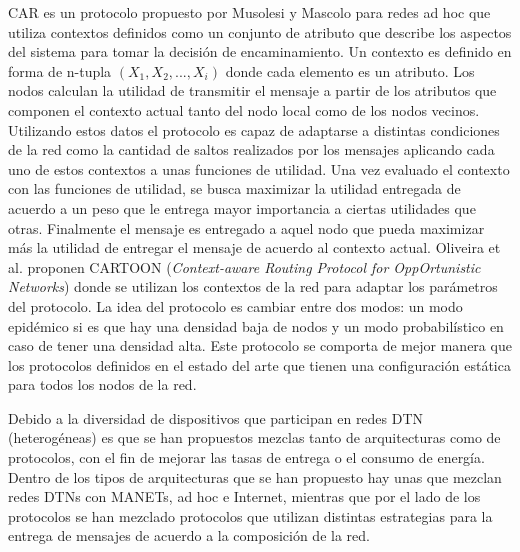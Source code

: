 CAR es un protocolo propuesto por Musolesi y
Mascolo\cite{DBLP:journals/tmc/MusolesiM09} para redes ad hoc que utiliza
contextos definidos como un conjunto de atributo que describe los aspectos del
sistema para tomar la decisión de encaminamiento. Un contexto es definido en
forma de n-tupla $(X_1, X_2, ..., X_i)$ donde cada elemento es un atributo. Los
nodos calculan la utilidad de transmitir el mensaje a partir de los atributos
que componen el contexto actual tanto del nodo local como de los nodos vecinos.
Utilizando estos datos el protocolo es capaz de adaptarse a distintas
condiciones de la red como la cantidad de saltos realizados por los mensajes
aplicando cada uno de estos contextos a unas funciones de utilidad. Una vez
evaluado el contexto con las funciones de utilidad, se busca maximizar la
utilidad entregada de acuerdo a un peso que le entrega mayor importancia a
ciertas utilidades que otras. Finalmente el mensaje es entregado a aquel nodo
que pueda maximizar más la utilidad de entregar el mensaje de acuerdo al
contexto actual.  Oliveira et al. \cite{DBLP:journals/ijwin/OliveiraSPNMMA16}
proponen CARTOON (\textit{Context-aware Routing Protocol for OppOrtunistic
Networks}) donde se utilizan los contextos de la red para adaptar los parámetros
del protocolo. La idea del protocolo es cambiar entre dos modos: un modo
epidémico si es que hay una densidad baja de nodos y un modo probabilístico en
caso de tener una densidad alta. Este protocolo se comporta de mejor manera que
los protocolos definidos en el estado del arte que tienen una configuración
estática para todos los nodos de la red.




Debido a la diversidad de dispositivos que participan en redes DTN
(heterogéneas) es que se han propuestos mezclas tanto de arquitecturas como de
protocolos, con el fin de mejorar las tasas de entrega o el consumo de energía.
Dentro de los tipos de arquitecturas que se han propuesto hay unas que mezclan
redes DTNs con MANETs, ad hoc e Internet, mientras que por el lado de los
protocolos se han mezclado protocolos que utilizan distintas estrategias para la
entrega de mensajes de acuerdo a la composición de la red.



